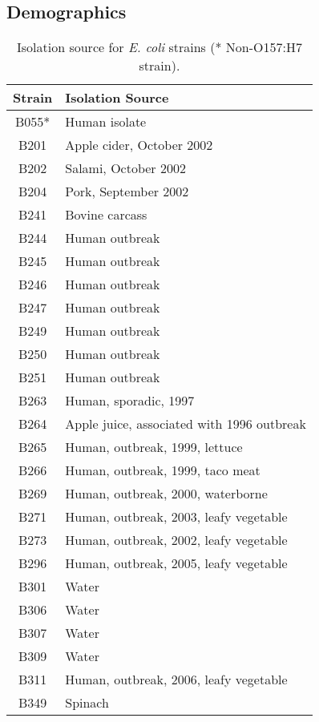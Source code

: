 \documentclass[11pt]{article}
\begin{document}
\subsection*{Demographics}
\begin{table}[h!]\small
\centering
\begin{tabular}{c|l}
\hline
\textbf{Strain} & \textbf{Isolation Source} \\
\hline
B055* & Human isolate                              \\
B201 & Apple cider, October 2002                  \\
B202 & Salami, October 2002                       \\
B204 & Pork, September 2002                       \\
B241 & Bovine carcass                             \\
B244 & Human outbreak                             \\
B245 & Human outbreak                             \\
B246 & Human outbreak                             \\
B247 & Human outbreak                             \\
B249 & Human outbreak                             \\
B250 & Human outbreak                             \\
B251 & Human outbreak                             \\
B263 & Human, sporadic, 1997                      \\
B264 & Apple juice, associated with 1996 outbreak \\
B265 & Human, outbreak, 1999, lettuce             \\
B266 & Human, outbreak, 1999, taco meat           \\
B269 & Human, outbreak, 2000, waterborne          \\
B271 & Human, outbreak, 2003, leafy vegetable     \\
B273 & Human, outbreak, 2002, leafy vegetable     \\
B296 & Human, outbreak, 2005, leafy vegetable     \\
B301 & Water                                      \\
B306 & Water                                      \\
B307 & Water                                      \\
B309 & Water                                      \\
B311 & Human, outbreak, 2006, leafy vegetable     \\
B349 & Spinach                                   
\end{tabular}
\caption{Isolation source for \textit{E. coli} strains (* Non-O157:H7 strain).}
\label{demographics}
\end{table}
\end{document}
